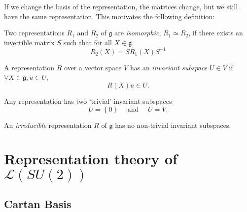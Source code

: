 If we change the basis of the representation, the matrices change, but we still have the same representation. This motivates the following definition:
\begin{definition}[]
  Two representations $R_1$ and $R_2$ of $\mathfrak{g}$ are \emph{isomorphic}, $R_1 \simeq R_2$, if there exists an invertible matrix $S$ such that for all $X \in \mathfrak{g}$.
  \begin{equation}
    R_2(X) = S R_1 (X) S^{-1}
  \end{equation}
\end{definition}
\begin{definition}[]
  A representation $R$ over a vector space $V$ has an \emph{invariant subspace} $U \in V$ if $\forall X \in \mathfrak{g}, u \in U$,
  \begin{equation}
    R(X) u \in U.
  \end{equation}
\end{definition}
\begin{example}[]
  Any representation has two `trivial' invariant subspaces
  \begin{equation}
    U= \left\{ 0 \right\} \quad \text{ and } \quad U = V.
  \end{equation}
\end{example}
\begin{definition}[]
  An \emph{irreducible} representation $R$ of $\mathfrak{g}$ has no non-trivial invariant subspaces.
\end{definition}

\section{Representation theory of \texorpdfstring{$\mathscr{L}(SU(2))$}{the Lie algebra of SU(2)}}%
\label{sec:representation_theory_of_texorpdfstring}

\subsection{Cartan Basis}%
\label{sub:cartan_basis}

